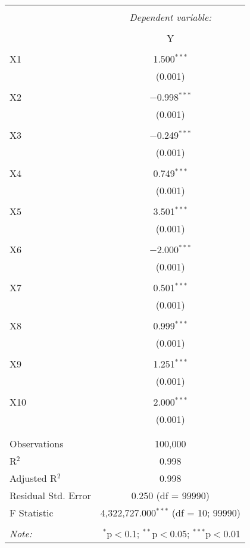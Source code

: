 \documentclass{article}
\begin{document}
\begin{table}[!htbp] \centering 
  \caption{} 
  \label{} 
\begin{tabular}{@{\extracolsep{5pt}}lc} 
\\[-1.8ex]\hline 
\hline \\[-1.8ex] 
 & \multicolumn{1}{c}{\textit{Dependent variable:}} \\ 
\cline{2-2} 
\\[-1.8ex] & Y \\ 
\hline \\[-1.8ex] 
 X1 & 1.500$^{***}$ \\ 
  & (0.001) \\ 
  & \\ 
 X2 & $-$0.998$^{***}$ \\ 
  & (0.001) \\ 
  & \\ 
 X3 & $-$0.249$^{***}$ \\ 
  & (0.001) \\ 
  & \\ 
 X4 & 0.749$^{***}$ \\ 
  & (0.001) \\ 
  & \\ 
 X5 & 3.501$^{***}$ \\ 
  & (0.001) \\ 
  & \\ 
 X6 & $-$2.000$^{***}$ \\ 
  & (0.001) \\ 
  & \\ 
 X7 & 0.501$^{***}$ \\ 
  & (0.001) \\ 
  & \\ 
 X8 & 0.999$^{***}$ \\ 
  & (0.001) \\ 
  & \\ 
 X9 & 1.251$^{***}$ \\ 
  & (0.001) \\ 
  & \\ 
 X10 & 2.000$^{***}$ \\ 
  & (0.001) \\ 
  & \\ 
\hline \\[-1.8ex] 
Observations & 100,000 \\ 
R$^{2}$ & 0.998 \\ 
Adjusted R$^{2}$ & 0.998 \\ 
Residual Std. Error & 0.250 (df = 99990) \\ 
F Statistic & 4,322,727.000$^{***}$ (df = 10; 99990) \\ 
\hline 
\hline \\[-1.8ex] 
\textit{Note:}  & \multicolumn{1}{r}{$^{*}$p$<$0.1; $^{**}$p$<$0.05; $^{***}$p$<$0.01} \\ 
\end{tabular} 
\end{table} 
\end{document}
